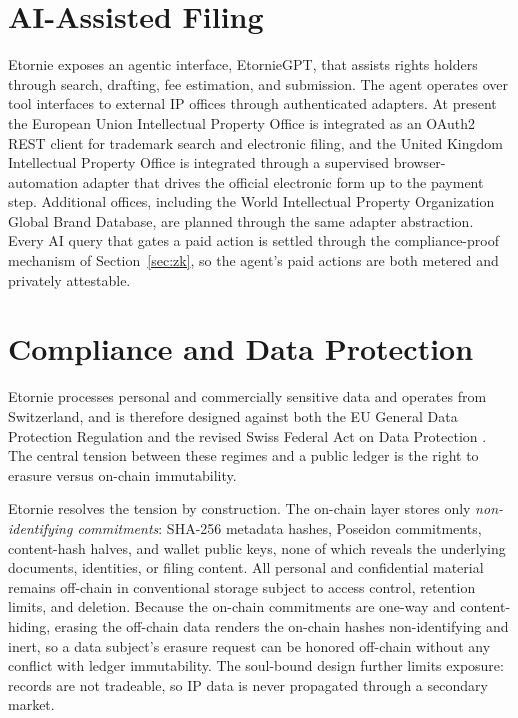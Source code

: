 \documentclass[conference]{IEEEtran}
\begin{document}
\section{AI-Assisted Filing}
\label{sec:agent}

Etornie exposes an agentic interface, EtornieGPT, that assists rights holders
through search, drafting, fee estimation, and submission. The agent operates
over tool interfaces to external IP offices through authenticated adapters. At
present the European Union Intellectual Property Office is integrated as an
OAuth2 REST client for trademark search and electronic filing, and the
United Kingdom Intellectual Property Office is integrated through a supervised
browser-automation adapter that drives the official electronic form up to the
payment step. Additional offices, including the World Intellectual Property
Organization Global Brand Database, are planned through the same adapter
abstraction. Every AI query that gates a paid action is settled through the
compliance-proof mechanism of Section~\ref{sec:zk}, so the agent's paid
actions are both metered and privately attestable.

\section{Compliance and Data Protection}
\label{sec:compliance}

Etornie processes personal and commercially sensitive data and operates from
Switzerland, and is therefore designed against both the EU General Data
Protection Regulation \cite{gdpr} and the revised Swiss Federal Act on Data
Protection \cite{fadp}. The central tension between these regimes and a public
ledger is the right to erasure versus on-chain immutability.

Etornie resolves the tension by construction. The on-chain layer stores only
\emph{non-identifying commitments}: SHA-256 metadata hashes, Poseidon
commitments, content-hash halves, and wallet public keys, none of which
reveals the underlying documents, identities, or filing content. All personal
and confidential material remains off-chain in conventional storage subject to
access control, retention limits, and deletion. Because the on-chain
commitments are one-way and content-hiding, erasing the off-chain data renders
the on-chain hashes non-identifying and inert, so a data subject's erasure
request can be honored off-chain without any conflict with ledger
immutability. The soul-bound design further limits exposure: records are not
tradeable, so IP data is never propagated through a secondary market.
\end{document}
